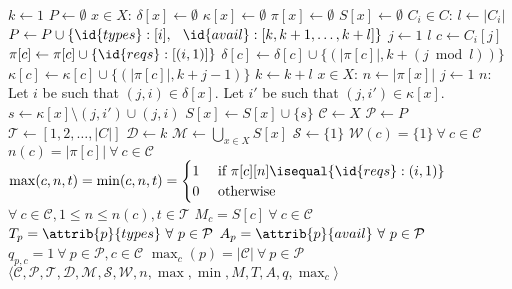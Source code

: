 \begin{codebox}
\li $k \gets 1$
\li $P \gets \emptyset$
\li \For $x \in X$:
\li \Do $\delta[x] \gets \emptyset$
\li     $\kappa[x] \gets \emptyset$
\li     $\pi[x] \gets \emptyset$
\li     $S[x] \gets \emptyset$
\End
\li \For $C_i \in C$:
\li \Do $l \gets |C_i|$
\li     $P \gets P \cup \{\id{types}: [i],$
\li\>\>          $\ \id{avail}: [k, k + 1, \dots, k + l]\}$
\li     \For $j \gets 1$ \To $l$
\li     \Do $c \gets C_i[j]$
\li         $\pi[c] \gets \pi[c] \cup \{\id{reqs} : [(i, 1)]\}$
\li         $\delta[c] \gets \delta[c] \cup \{(|\pi[c]|, k + (j \bmod{l}))\}$
\li         $\kappa[c] \gets \kappa[c] \cup \{(|\pi[c]|, k + j - 1)\}$
\End
\li     $k \gets k + l$
\End
\li \For $x \in X$:
\li \Do $n \gets |\pi[x]|$
\li     \For $j \gets 1$ \To $n$:
\li     \Do Let $i$ be such that $(j, i) \in \delta[x]$.
\li         Let $i'$ be such that $(j, i') \in \kappa[x]$.
\li         $s \gets \kappa[x] \setminus (j, i') \cup (j, i)$
\li         $S[x] \gets S[x] \cup \{s\}$
        \End
\End
\li $\mathcal{C} \gets X$
\li $\mathcal{P} \gets P$
\li $\mathcal{T} \gets [1, 2, \dots, |C|]$
\li $\mathcal{D} \gets k$
\li $\mathcal{M} \gets \bigcup_{x \in X} S[x]$
\li $\mathcal{S} \gets \{1\}$
\li $\mathcal{W}(c) = \{1\}\ \forall\ c \in \mathcal{C}$
\li $n(c) = |\pi[c]|\ \forall\ c \in \mathcal{C}$
\li $\max(c, n, t) = \min(c, n, t) = \begin{cases}
1 & \text{ if } \pi[c][n] \isequal \{\id{reqs} : (i, 1)\}\\
0 & \text{ otherwise}
\end{cases}$
\li \>\>$\forall\ c \in \mathcal{C}, 1 \le n \le n(c), t \in \mathcal{T}$
\li $M_c = S[c]\ \forall\ c \in \mathcal{C}$
\li $T_p = \attrib{p}{types}\ \forall\ p \in \mathcal{P}$
\li $A_p = \attrib{p}{avail}\ \forall\ p \in \mathcal{P}$
\li $q_{p, c} = 1\ \forall\ p \in \mathcal{P}, c \in \mathcal{C}$
\li $\max_c(p) = |\mathcal{C}|\ \forall\ p \in \mathcal{P}$
\li \Return $\langle \mathcal{C}, \mathcal{P}, \mathcal{T}, \mathcal{D}, \mathcal{M}, \mathcal{S}, \mathcal{W}, n, \max, \min, M, T, A, q, \max_c \rangle$
\end{codebox}




